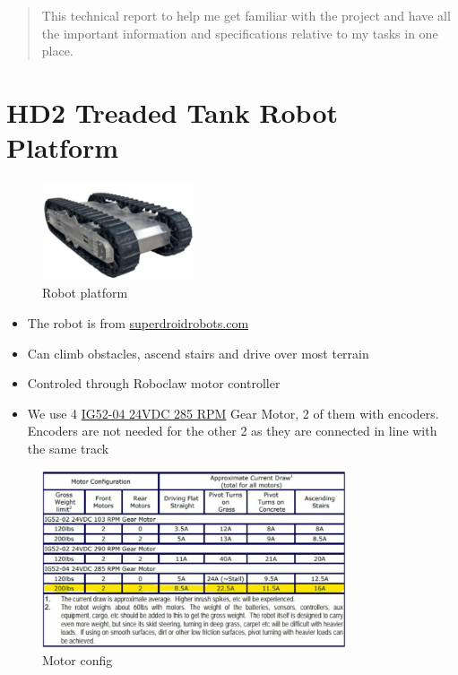 \documentclass[12pt,letterpaper,oneside]{article}
\begin{document}
\makeCustomTitle
\thispagestyle{titlePage}

\begin{abstract}
This technical report to help me get familiar with the project and have all the important information and specifications relative to my tasks in one place.
\end{abstract}

\section{HD2 Treaded Tank Robot Platform}

\begin{figure}[h]
    \centering
    \includegraphics[width=0.4\textwidth]{./figures/platform.jpg}
    \caption{Robot platform}
    \label{fig:my_label}
\end{figure}

\begin{itemize}
    \item The robot is from \href{https://www.superdroidrobots.com/shop/item.aspx/hd2-treaded-atr-tank-robot-platform/789/}{superdroidrobots.com}
    \item Can climb obstacles, ascend stairs and drive over most terrain
    \item Controled through Roboclaw motor controller
    \item We use 4 \href{https://www.superdroidrobots.com/shop/item.aspx/ig52-04-24vdc-285-rpm-gear-motor-with-encoder/843/}{IG52-04 24VDC 285 RPM} Gear Motor, 2 of them with encoders. Encoders are not needed for the other 2 as they are connected in line with the same track
\end{itemize}

\begin{figure}[h]
    \centering
    \includegraphics[width=0.8\textwidth]{figures/motorSpecs.jpg}
    \caption{Motor config}
    \label{fig:my_label}
\end{figure}
\end{document}
